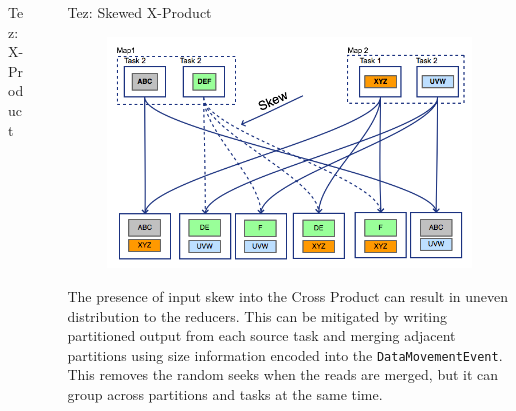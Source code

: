 \documentclass[final]{beamer}
\newlength{\sepwid}
\newlength{\onecolwid}
\newlength{\twocolwid}
\begin{document}
\begin{frame}[t]
\begin{columns}[t]
\begin{column}{\twocolwid}
\begin{columns}[t,totalwidth=\twocolwid]
\begin{column}{\onecolwid}
\begin{block}{Tez: X-Product}
\end{block}



\end{column} %

\end{columns} %

\end{column} %

\begin{column}{\sepwid}\end{column} %

\begin{column}{\onecolwid} %


\begin{block}{Tez: Skewed X-Product}

\begin{figure}
\includegraphics{figures/Tez-XProd-2.png}
\end{figure}

The presence of input skew into the Cross Product can result in uneven distribution to the reducers. This can be
mitigated by writing partitioned output from each source task and merging adjacent partitions using size information
encoded into the \texttt{DataMovementEvent}. This removes the random seeks when the reads are merged, but it can group
across partitions and tasks at the same time.


\end{block}
\end{column}
\end{columns}
\end{frame}
\end{document}
